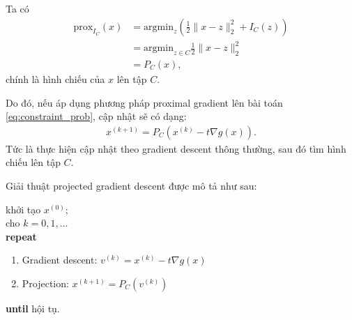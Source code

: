 \documentclass{book}
\begin{document}
Ta có
\begin{align*}
\mathrm{prox}_{I_C}(x) &= \mathrm{argmin}_z \left( \frac{1}{2}\| x - z \|_2^2  + I_C (z) \right) \\
				& = \mathrm{argmin}_{z \in C} \frac{1}{2}\| x - z \|_2^2  \\
				& = P_C(x),
\end{align*}
chính là hình chiếu của $x$ lên tập $C$.

Do đó, nếu áp dụng phương pháp proximal gradient lên bài toán \eqref{eq:constraint_prob}, cập nhật sẽ có dạng: 
\begin{align*}
x^{(k+1)} = P_C (x^{(k)} - t \nabla g(x)).
\end{align*}
Tức là thực hiện cập nhật theo gradient descent thông thường, sau đó tìm hình chiếu lên tập $C$.

Giải thuật projected gradient descent được mô tả như sau:
\begin{algorithm}[H]
khởi tạo $x^{(0)}$;\\
cho $k = 0,1,\ldots$\\
\textbf{repeat} 
\begin{enumerate}
\item Gradient descent: $v^{(k)} =  x^{(k)} - t \nabla g(x)$
\item Projection: $x^{(k + 1)} = P_C(v^{(k)})$
\end{enumerate}
\textbf{until} hội tụ. 
\caption{Giải thuật projected gradient descent.}
\label{alg:projectedGD}
\end{algorithm}
\end{document}
